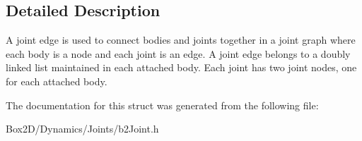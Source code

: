 \subsection{Detailed Description}
A joint edge is used to connect bodies and joints together in a joint graph where each body is a node and each joint is an edge. A joint edge belongs to a doubly linked list maintained in each attached body. Each joint has two joint nodes, one for each attached body. 

The documentation for this struct was generated from the following file\+:\begin{DoxyCompactItemize}
\item 
Box2\+D/\+Dynamics/\+Joints/b2\+Joint.\+h\end{DoxyCompactItemize}
